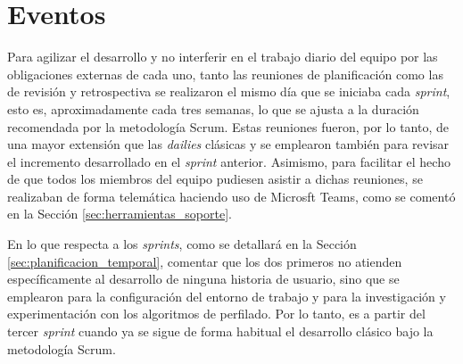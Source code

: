 \section{Eventos}
\label{sec:metodologia_eventos}

Para agilizar el desarrollo y no interferir en el trabajo diario del equipo por las obligaciones
externas de cada uno, tanto las reuniones de planificación como las de revisión y retrospectiva se realizaron
el mismo día que se iniciaba cada \textit{sprint}, esto es, aproximadamente cada tres semanas, lo que se ajusta a la duración recomendada
por la metodología Scrum. Estas reuniones fueron, por lo tanto, de una mayor extensión que las \textit{dailies} clásicas y se emplearon también
para revisar el incremento desarrollado en el \textit{sprint} anterior. Asimismo, para facilitar el hecho de que todos los miembros
del equipo pudiesen asistir a dichas reuniones, se realizaban de forma telemática haciendo uso de Microsft Teams, como se comentó en la Sección \ref{sec:herramientas_soporte}.

\bigskip
En lo que respecta a los \textit{sprints}, como se detallará en la Sección \ref{sec:planificacion_temporal}, comentar que los dos primeros
no atienden específicamente al desarrollo de ninguna historia de usuario, sino que se emplearon para la configuración del entorno de trabajo
y para la investigación y experimentación con los algoritmos de perfilado. Por lo tanto, es a partir del tercer \textit{sprint} cuando
ya se sigue de forma habitual el desarrollo clásico bajo la metodología Scrum.
